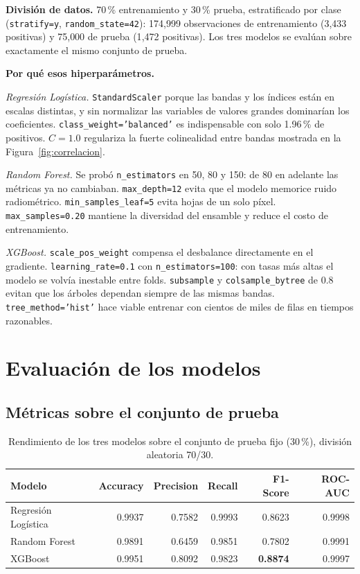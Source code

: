 \documentclass[11pt]{article}
\begin{document}
\textbf{División de datos.} 70\,\% entrenamiento y 30\,\% prueba, estratificado por clase (\texttt{stratify=y}, \texttt{random\_state=42}): 174{,}999 observaciones de entrenamiento (3{,}433 positivas) y 75{,}000 de prueba (1{,}472 positivas). Los tres modelos se evalúan sobre exactamente el mismo conjunto de prueba.

\textbf{Por qué esos hiperparámetros.}

\emph{Regresión Logística.} \texttt{StandardScaler} porque las bandas y los índices están en escalas distintas, y sin normalizar las variables de valores grandes dominarían los coeficientes. \texttt{class\_weight='balanced'} es indispensable con solo 1.96\,\% de positivos. \(C=1.0\) regulariza la fuerte colinealidad entre bandas mostrada en la Figura~\ref{fig:correlacion}.

\emph{Random Forest.} Se probó \texttt{n\_estimators} en 50, 80 y 150: de 80 en adelante las métricas ya no cambiaban. \texttt{max\_depth=12} evita que el modelo memorice ruido radiométrico. \texttt{min\_samples\_leaf=5} evita hojas de un solo píxel. \texttt{max\_samples=0.20} mantiene la diversidad del ensamble y reduce el costo de entrenamiento.

\emph{XGBoost.} \texttt{scale\_pos\_weight} compensa el desbalance directamente en el gradiente. \texttt{learning\_rate=0.1} con \texttt{n\_estimators=100}: con tasas más altas el modelo se volvía inestable entre folds. \texttt{subsample} y \texttt{colsample\_bytree} de 0.8 evitan que los árboles dependan siempre de las mismas bandas. \texttt{tree\_method='hist'} hace viable entrenar con cientos de miles de filas en tiempos razonables.

\section{Evaluación de los modelos}
\label{sec:evaluacion}

\subsection{Métricas sobre el conjunto de prueba}

\begin{table}[H]
\centering
\caption{Rendimiento de los tres modelos sobre el conjunto de prueba fijo (30\,\%), división aleatoria 70/30.}
\label{tab:metricas_test}
\begin{tabular}{lrrrrr}
\toprule
Modelo & Accuracy & Precision & Recall & F1-Score & ROC-AUC \\
\midrule
Regresión Logística & 0.9937 & 0.7582 & 0.9993 & 0.8623 & 0.9998 \\
Random Forest        & 0.9891 & 0.6459 & 0.9851 & 0.7802 & 0.9991 \\
XGBoost               & 0.9951 & 0.8092 & 0.9823 & \textbf{0.8874} & 0.9997 \\
\bottomrule
\end{tabular}
\end{table}
\end{document}
